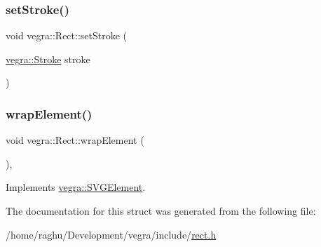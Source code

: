 \subsubsection{\texorpdfstring{set\+Stroke()}{setStroke()}}
{\footnotesize\ttfamily void vegra\+::\+Rect\+::set\+Stroke (\begin{DoxyParamCaption}\item[{\mbox{\hyperlink{structvegra_1_1Stroke}{vegra\+::\+Stroke}}}]{stroke }\end{DoxyParamCaption})\hspace{0.3cm}{\ttfamily [inline]}}

\mbox{\label{structvegra_1_1Rect_a1a0b6b2fa5804f2554f62d41c3a156f3}} 
\subsubsection{\texorpdfstring{wrap\+Element()}{wrapElement()}}
{\footnotesize\ttfamily void vegra\+::\+Rect\+::wrap\+Element (\begin{DoxyParamCaption}{ }\end{DoxyParamCaption})\hspace{0.3cm}{\ttfamily [inline]}, {\ttfamily [virtual]}}



Implements \mbox{\hyperlink{structvegra_1_1SVGElement_a1369400ebe57287f1b5beb5f0234d8d7}{vegra\+::\+S\+V\+G\+Element}}.



The documentation for this struct was generated from the following file\+:\begin{DoxyCompactItemize}
\item 
/home/raghu/\+Development/vegra/include/\mbox{\hyperlink{rect_8h}{rect.\+h}}\end{DoxyCompactItemize}
